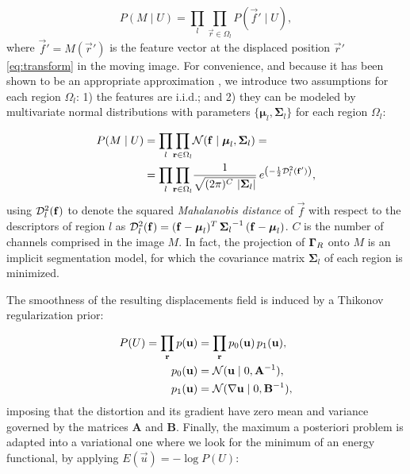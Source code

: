   \begin{equation}
  P(M \mid U) = \underset{l}{\prod} \underset{\vec{r}\in \Omega_l}{\prod}
    P\left( \vec{f}' \mid U \right),
  \label{eq:bayes_aposteriori}
  \end{equation}
%
  where $\vec{f}' = M(\vec{r}')$ is the feature vector at the displaced
  position $\vec{r}'$ \eqref{eq:transform} in the moving image.
For convenience, and because it has been shown to be an appropriate approximation
  \citep{leemput_automated_1999,cuadra_comparison_2005}, we introduce two assumptions for each
  region $\Omega_l$:
  1) the features are i.i.d.; and 2) they can be modeled by multivariate normal
  distributions with parameters $\lbrace \boldsymbol{\mu}_l, \boldsymbol{\Sigma}_{l} \rbrace$
  for each region $\Omega_l$:

 	\begin{align}
  P( M \mid U) &= \underset{l}{\prod} \underset{\vec{r} \in \Omega_l}{\prod}
  \mathcal{N} ( \vec{f} \mid \boldsymbol{\mu}_l, \boldsymbol{\Sigma}_{l} ) = \notag\\
  &= \underset{l}{\prod} \underset{\vec{r} \in \Omega_l}{\prod} \frac{1}{ \sqrt{(2\pi)^{C}\,\left|\boldsymbol{\Sigma}_{l}\right|}}\,{e^{\left(-\frac{1}{2}
  \mdist{f'}{l} \right)}},
  \label{eq:pdf}
  \end{align}
%
  using $\mdist{f}{l}$ to denote the squared \emph{Mahalanobis distance} of $\vec{f}$ with respect
  to the descriptors of region $l$ as
  $\mdist{f}{l} = (\vec{f} - \boldsymbol{\mu}_l)^T \, {\boldsymbol{\Sigma}_l}^{-1} \, (\vec{f} - \boldsymbol{\mu}_l)$.
$C$ is the number of channels comprised in the image $M$.
In fact, the projection of $\gammaset_R$ onto $M$ is an implicit segmentation model, for which
  the covariance matrix $\boldsymbol{\Sigma}_l$ of each region is minimized.

The smoothness of the resulting displacements field is induced by a Thikonov regularization
  prior:

  \begin{align}
  P(U) = \underset{\vec{r}}{\prod}\, p(\vec{u}) &=
  \underset{\vec{r}}{\prod}\, p_0(\vec{u}) \, p_1(\vec{u}), \\
  p_0(\vec{u}) &= \mathcal{N}( \vec{u} \mid 0, \mathbf{A}^{-1}), \notag\\
  p_1(\vec{u}) &= \mathcal{N}(  \nabla \vec{u} \mid 0, \mathbf{B}^{-1}),
  \label{eq:thikonov}
  \end{align}
%
  imposing that the distortion and its gradient have zero
  mean and variance governed by the matrices $\mathbf{A}$ and $\mathbf{B}$.
Finally, the maximum a posteriori problem is adapted into a variational one where we look for
  the minimum of an energy functional, by applying $E(\vec{u}) = -\log P(U)$:

